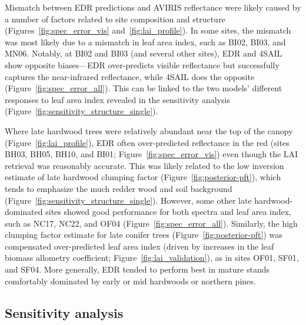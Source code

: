 
Mismatch between EDR predictions and AVIRIS reflectance were likely caused by a number of factors related to site composition and structure (Figures~\ref{fig:spec_error_vis} and~\ref{fig:lai_profile}).
In some sites, the mismatch was most likely due to a mismatch in leaf area index, such as BI02, BI03, and MN06.
Notably, at BI02 and BI03 (and several other sites), EDR and 4SAIL show opposite biases---EDR over-predicts visible reflectance but successfully captures the near-infrared reflectance, while 4SAIL does the opposite (Figure~\ref{fig:spec_error_all}).
This can be linked to the two models' different responses to leaf area index revealed in the sensitivity analysis (Figure~\ref{fig:sensitivity_structure_single}).

Where late hardwood trees were relatively abundant near the top of the canopy (Figure~\ref{fig:lai_profile}), EDR often over-predicted reflectance in the red (sites BH03, BH05, BH10, and BI01; Figure~\ref{fig:spec_error_vis}) even though the LAI retrieval was reasonably accurate.
This was likely related to the low inversion estimate of late hardwood clumping factor (Figure~\ref{fig:posterior-pft}), which tends to emphasize the much redder wood and soil background (Figure~\ref{fig:sensitivity_structure_single}).
However, some other late hardwood-dominated sites showed good performance for both spectra and leaf area index, such as NC17, NC22, and OF04 (Figure~\ref{fig:spec_error_all}).
Similarly, the high clumping factor estimate for late conifer trees (Figure~\ref{fig:posterior-pft}) was compensated over-predicted leaf area index (driven by increases in the leaf biomass allometry coefficient; Figure~\ref{fig:lai_validation}), as in sites OF01, SF01, and SF04.
More generally, EDR tended to perform best in mature stands comfortably dominated by early or mid hardwoods or northern pines.

\subsection{Sensitivity analysis}

